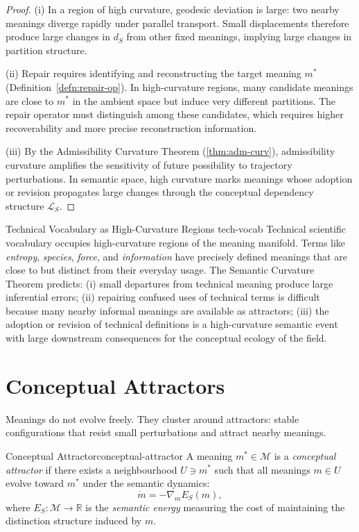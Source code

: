 \documentclass[12pt,twoside,openright]{book}
\begin{document}
\begin{proof}
  (i) In a region of high curvature, geodesic
  deviation is large: two nearby meanings diverge
  rapidly under parallel transport. Small displacements
  therefore produce large changes in $d_S$ from other
  fixed meanings, implying large changes in partition
  structure.

  (ii) Repair requires identifying and reconstructing
  the target meaning $m^*$
  (Definition~\ref{defn:repair-op}).
  In high-curvature regions, many candidate meanings
  are close to $m^*$ in the ambient space but induce
  very different partitions. The repair operator must
  distinguish among these candidates, which requires
  higher recoverability and more precise reconstruction
  information.

  (iii) By the Admissibility Curvature Theorem
  (\cref{thm:adm-curv}), admissibility curvature
  amplifies the sensitivity of future possibility to
  trajectory perturbations. In semantic space, high
  curvature marks meanings whose adoption or revision
  propagates large changes through the conceptual
  dependency structure $\mathcal{L}_S$.
\end{proof}

\begin{example}{Technical Vocabulary as High-Curvature Regions}%
  {tech-vocab}
  Technical scientific vocabulary occupies high-curvature
  regions of the meaning manifold.
  Terms like \emph{entropy}, \emph{species},
  \emph{force}, and \emph{information} have precisely
  defined meanings that are close to but distinct from
  their everyday usage.
  The Semantic Curvature Theorem predicts:
  (i) small departures from technical meaning
  produce large inferential errors;
  (ii) repairing confused uses of technical terms
  is difficult because many nearby informal meanings
  are available as attractors;
  (iii) the adoption or revision of technical
  definitions is a high-curvature semantic event
  with large downstream consequences for the
  conceptual ecology of the field.
\end{example}

\section{Conceptual Attractors}

Meanings do not evolve freely. They cluster around
attractors: stable configurations that resist small
perturbations and attract nearby meanings.

\begin{definition}{Conceptual Attractor}{conceptual-attractor}
  A meaning $m^* \in \mathcal{M}$ is a
  \emph{conceptual attractor} if there exists a
  neighbourhood $U \ni m^*$ such that all meanings
  $m \in U$ evolve toward $m^*$ under the semantic
  dynamics:
  \[
    \dot{m} = -\nabla_m E_S(m),
  \]
  where $E_S : \mathcal{M} \to \mathbb{R}$ is the
  \emph{semantic energy} measuring the cost of
  maintaining the distinction structure induced by $m$.
\end{definition}
\end{document}
